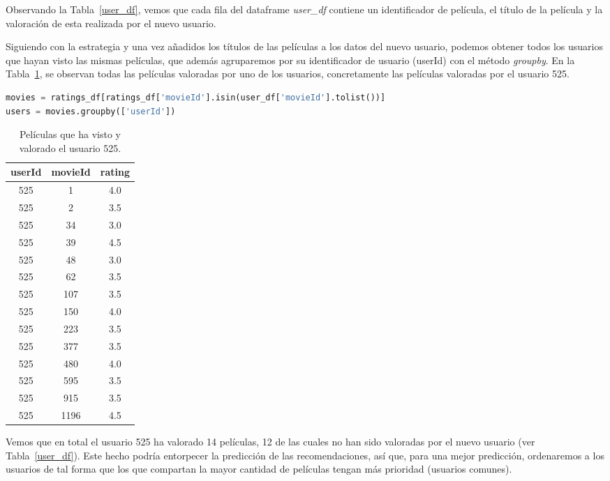 \documentclass{uimppracticas}
\begin{document}
Observando la Tabla~\ref{user_df}, vemos que cada fila del dataframe \textit{user\_df} contiene un identificador de película, el título de la película y la valoración de esta realizada por el nuevo usuario. 

Siguiendo con la estrategia y una vez añadidos los títulos de las películas a los datos del nuevo usuario, podemos obtener todos los usuarios que hayan visto las mismas películas, que además agruparemos por su identificador de usuario (userId) con el método \textit{groupby}. En la Tabla~\ref{user_525}, se observan todas las películas valoradas por uno de los usuarios, concretamente las películas valoradas por el usuario 525.

\begin{lstlisting}[language=python, basicstyle=\small]
movies = ratings_df[ratings_df['movieId'].isin(user_df['movieId'].tolist())]
users = movies.groupby(['userId'])
\end{lstlisting}

\begin{table}[H]
	\centering
	\begin{tabular}{ccc}
		\toprule
		userId &  movieId &  rating \\
		\midrule
		525 &        1 &     4.0 \\
		525 &        2 &     3.5 \\
		525 &       34 &     3.0 \\
		525 &       39 &     4.5 \\
		525 &       48 &     3.0 \\
		525 &       62 &     3.5 \\
		525 &      107 &     3.5 \\
		525 &      150 &     4.0 \\
		525 &      223 &     3.5 \\
		525 &      377 &     3.5 \\
		525 &      480 &     4.0 \\
		525 &      595 &     3.5 \\
		525 &      915 &     3.5 \\
		525 &     1196 &     4.5 \\
		\bottomrule
	\end{tabular}
	\caption{Películas que ha visto y valorado el usuario 525.}
	\label{user_525}
\end{table}

Vemos que en total el usuario 525 ha valorado 14 películas, 12 de las cuales no han sido valoradas por el nuevo usuario (ver Tabla~\ref{user_df}). Este hecho podría entorpecer la predicción de las recomendaciones, así que, para una mejor predicción, ordenaremos a los usuarios de tal forma que los que compartan la mayor cantidad de películas tengan más prioridad (usuarios comunes).
\end{document}
